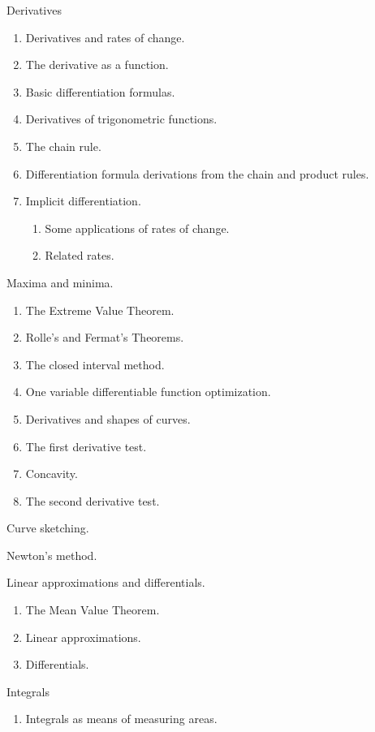 \documentclass{article}
\begin{document}
\begin{landscape}
\item Derivatives
\begin{enumerate}[label*=\arabic*.]
\item Derivatives and rates of change.
\item The derivative as a function.
\item Basic differentiation formulas.
\item Derivatives of trigonometric functions.
\item The chain rule.
\item Differentiation formula derivations from the chain and product rules.
\item Implicit differentiation.
\begin{enumerate}[label*=\arabic*.]
\item Some applications of rates of change.
\item Related rates.
\end{enumerate}
\end{enumerate}
\item Maxima and minima.
\begin{enumerate}[label*=\arabic*.]
\item The Extreme Value Theorem.
\item Rolle's and Fermat's Theorems.
\item The closed interval method.
\item One variable differentiable function optimization.
\item Derivatives and shapes of curves.
\item The first derivative test.
\item Concavity.
\item The second derivative test. 
\end{enumerate}
\item Curve sketching.
\item Newton's method.
\item Linear approximations and differentials.
\begin{enumerate}[label*=\arabic*.]
\item The Mean Value Theorem.
\item Linear approximations.
\item Differentials.
\end{enumerate}
\item Integrals
\begin{enumerate}[label*=\arabic*.]
\item Integrals as means of measuring areas.

\end{enumerate}
\end{landscape}
\end{document}
